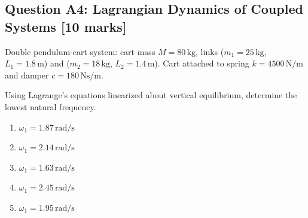 \documentclass[12pt,a4paper]{article}
\begin{document}
\begin{questionbox}
\subsection*{Question A4: Lagrangian Dynamics of Coupled Systems [10 marks]}
Double pendulum-cart system: cart mass $M = 80\,\text{kg}$, links ($m_1 = 25\,\text{kg}$, $L_1 = 1.8\,\text{m}$) 
and ($m_2 = 18\,\text{kg}$, $L_2 = 1.4\,\text{m}$). Cart attached to spring $k = 4500\,\text{N/m}$ 
and damper $c = 180\,\text{Ns/m}$.

\begin{center}
\end{center}

Using Lagrange's equations linearized about vertical equilibrium, determine the lowest natural frequency.

\begin{mcqbox}
\begin{enumerate}[label=(\Alph*),leftmargin=*]
    \item $\omega_1 = 1.87\,\text{rad/s}$
    \item $\omega_1 = 2.14\,\text{rad/s}$
    \item $\omega_1 = 1.63\,\text{rad/s}$
    \item $\omega_1 = 2.45\,\text{rad/s}$
    \item $\omega_1 = 1.95\,\text{rad/s}$
\end{enumerate}
\end{mcqbox}
\end{questionbox}
\end{document}
